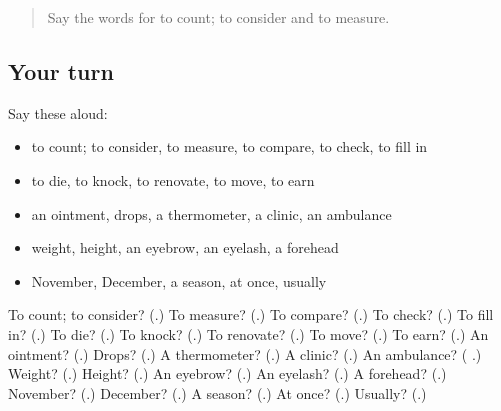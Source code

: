 \label{lesson:RU-R240-second-pass-words-from-chapters-236-240}



\begin{quote}
Say the words for to count; to consider and to measure.
\end{quote}

\subsection*{Your turn}
Say these aloud:

\begin{itemize}
\raggedright
  \item to count; to consider, to measure, to compare, to check, to fill in
  \item to die, to knock, to renovate, to move, to earn
  \item an ointment, drops, a thermometer, a clinic, an ambulance
  \item weight, height, an eyebrow, an eyelash, a forehead
  \item November, December, a season, at once, usually
\end{itemize}

\begin{tcolorbox}[breakable,colback=teal!4,colframe=teal!35!black,title={Before you move on}]
To count; to consider? (\textbf{}.) To measure? (\textbf{}.) To compare? (\textbf{}.) To check? (\textbf{}.) To fill in? (\textbf{}.) To die? (\textbf{}.) To knock? (\textbf{}.) To renovate? (\textbf{}.) To move? (\textbf{}.) To earn? (\textbf{}.) An ointment? (\textbf{}.) Drops? (\textbf{}.) A thermometer? (\textbf{}.) A clinic? (\textbf{}.) An ambulance? (\textbf{ }.) Weight? (\textbf{}.) Height? (\textbf{}.) An eyebrow? (\textbf{}.) An eyelash? (\textbf{}.) A forehead? (\textbf{}.) November? (\textbf{}.) December? (\textbf{}.) A season? (\textbf{}.) At once? (\textbf{}.) Usually? (\textbf{}.)
\end{tcolorbox}
